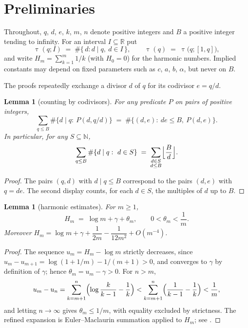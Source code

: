 \documentclass[11pt]{amsart}
\newtheorem{lemma}[theorem]{Lemma}
\theoremstyle{remark}
\newcommand{\N}{\mathbb{N}}
\newcommand{\R}{\mathbb{R}}
\newcommand{\eul}{\gamma}
\DeclareMathOperator{\divc}{\tau}
\begin{document}
\section{Preliminaries}\label{sec:prelim}

Throughout, $q$, $d$, $e$, $k$, $m$, $n$ denote positive integers and
$B$ a positive integer tending to infinity.  For an interval
$I\subseteq\R$ put
\[
\divc(q;I)\;=\;\#\{\,d : d\mid q,\ d\in I\,\},
\qquad
\divc(q)\;=\;\divc\bigl(q;[1,q]\bigr),
\]
and write $H_{m}=\sum_{k=1}^{m}1/k$ (with $H_{0}=0$) for the harmonic
numbers.  Implied constants may depend on fixed parameters such as $c$,
$a$, $b$, $\alpha$, but never on $B$.

The proofs repeatedly exchange a divisor $d$ of $q$ for its codivisor
$e=q/d$.

\begin{lemma}[counting by codivisors]\label{lem:swap}
For any predicate $P$ on pairs of positive integers,
\[
\sum_{q\le B}\#\{d\mid q:\ P(d,q/d)\}
\;=\;\#\{(d,e):\ de\le B,\ P(d,e)\}.
\]
In particular, for any $S\subseteq\N$,
\[
\sum_{q\le B}\#\{d\mid q:\ d\in S\}
\;=\;\sum_{\substack{d\in S\\ d\le B}}
\Bigl\lfloor\frac{B}{d}\Bigr\rfloor .
\]
\end{lemma}

\begin{proof}
The pairs $(q,d)$ with $d\mid q\le B$ correspond to the pairs $(d,e)$
with $q=de$.  The second display counts, for each $d\in S$, the
multiples of $d$ up to $B$.
\end{proof}

\begin{lemma}[harmonic estimates]\label{lem:harmonic}
For $m\ge1$,
\[
H_{m}\;=\;\log m+\eul+\theta_{m},\qquad 0<\theta_{m}<\frac1m .
\]
Moreover
$H_{m}=\log m+\eul+\dfrac{1}{2m}-\dfrac{1}{12m^{2}}+O(m^{-4})$.
\end{lemma}

\begin{proof}
The sequence $u_{m}=H_{m}-\log m$ strictly decreases, since
$u_{m}-u_{m+1}=\log(1+1/m)-1/(m+1)>0$, and converges to $\eul$ by
definition of $\eul$; hence $\theta_{m}=u_{m}-\eul>0$.  For $n>m$,
\[
u_{m}-u_{n}
=\sum_{k=m+1}^{n}\Bigl(\log\frac{k}{k-1}-\frac1k\Bigr)
<\sum_{k=m+1}^{n}\Bigl(\frac1{k-1}-\frac1k\Bigr)
<\frac1m,
\]
and letting $n\to\infty$ gives $\theta_{m}\le1/m$, with equality
excluded by strictness.  The refined expansion is Euler--Maclaurin
summation applied to $H_{m}$; see \cite[\S9.6]{GKP}.
\end{proof}
\end{document}
